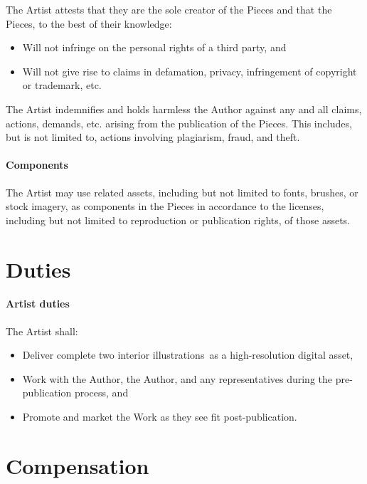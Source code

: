 \documentclass[12pt,letterpaper]{article}
\def\ArtType{two interior illustrations}
\begin{document}
The Artist attests that they are the sole creator of the Pieces and that the Pieces, to the best of their knowledge:

\begin{itemize}
    \item Will not infringe on the personal rights of a third party, and
    \item Will not give rise to claims in defamation, privacy, infringement of copyright or trademark, etc.
\end{itemize}

The Artist indemnifies and holds harmless the Author against any and all claims, actions, demands, etc. arising from the publication of the Pieces. This includes, but is not limited to, actions involving plagiarism, fraud, and theft.

\paragraph{Components}

The Artist may use related assets, including but not limited to fonts, brushes, or stock imagery, as components in the Pieces in accordance to the licenses, including but not limited to reproduction or publication rights, of those assets.

\section{Duties}

\paragraph{Artist duties}

The Artist shall:

\begin{itemize}
    \item Deliver complete \ArtType\ as a high-resolution digital asset,
    \item Work with the Author, the Author, and any representatives during the pre-publication process, and
    \item Promote and market the Work as they see fit post-publication.
\end{itemize}

\section{Compensation}
\end{document}
